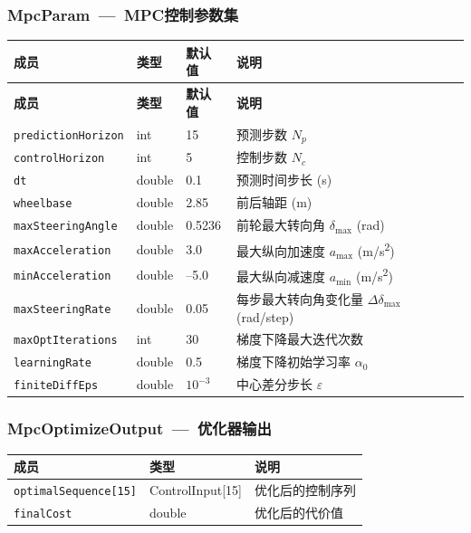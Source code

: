\documentclass[a4paper,10pt]{article}
\begin{document}
\subsubsection{MpcParam~---~MPC控制参数集}
\begin{longtable}{|L{4cm}|C{1.5cm}|C{1.5cm}|L{8cm}|}
\hline
\textbf{成员} & \textbf{类型} & \textbf{默认值} & \textbf{说明} \\
\hline
\endfirsthead
\hline
\textbf{成员} & \textbf{类型} & \textbf{默认值} & \textbf{说明} \\
\hline
\endhead
\texttt{predictionHorizon} & int & 15 & 预测步数 $N_p$ \\
\hline
\texttt{controlHorizon} & int & 5 & 控制步数 $N_c$ \\
\hline
\texttt{dt} & double & 0.1 & 预测时间步长 (s) \\
\hline
\texttt{wheelbase} & double & 2.85 & 前后轴距 (m) \\
\hline
\texttt{maxSteeringAngle} & double & 0.5236 & 前轮最大转向角 $\delta_{\max}$ (rad) \\
\hline
\texttt{maxAcceleration} & double & 3.0 & 最大纵向加速度 $a_{\max}$ (m/s\textsuperscript{2}) \\
\hline
\texttt{minAcceleration} & double & --5.0 & 最大纵向减速度 $a_{\min}$ (m/s\textsuperscript{2}) \\
\hline
\texttt{maxSteeringRate} & double & 0.05 & 每步最大转向角变化量 $\Delta\delta_{\max}$ (rad/step) \\
\hline
\texttt{maxOptIterations} & int & 30 & 梯度下降最大迭代次数 \\
\hline
\texttt{learningRate} & double & 0.5 & 梯度下降初始学习率 $\alpha_0$ \\
\hline
\texttt{finiteDiffEps} & double & $10^{-3}$ & 中心差分步长 $\varepsilon$ \\
\hline
\end{longtable}

\subsubsection{MpcOptimizeOutput~---~优化器输出}
\begin{longtable}{|L{4.5cm}|C{2.8cm}|L{7.7cm}|}
\hline
\textbf{成员} & \textbf{类型} & \textbf{说明} \\
\hline
\texttt{optimalSequence[15]} & ControlInput[15] & 优化后的控制序列 \\
\hline
\texttt{finalCost} & double & 优化后的代价值 \\
\hline
\end{longtable}
\end{document}
